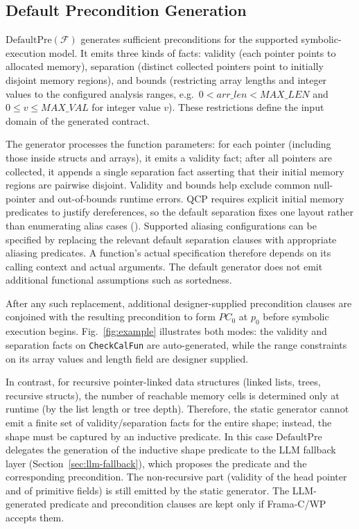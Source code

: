 \subsection{Default Precondition Generation}
\label{sec:default-pre}
{$\mathrm{DefaultPre}(\mathcal{F})$ generates sufficient preconditions for the supported symbolic-execution model. It emits three kinds of facts: validity (each pointer points to allocated memory), separation (distinct collected pointers point to initially disjoint memory regions), and bounds (restricting array lengths and integer values to the configured analysis ranges, e.g.\ $0 < \mathit{arr\_len} < \mathit{MAX\_LEN}$ and $0 \le v \le \mathit{MAX\_VAL}$ for integer value $v$). These restrictions define the input domain of the generated contract.

The generator processes the function parameters: for each pointer (including those inside structs and arrays), it emits a validity fact; after all pointers are collected, it appends a single separation fact asserting that their initial memory regions are pairwise disjoint. Validity and bounds help exclude common null-pointer and out-of-bounds runtime errors. {QCP requires explicit initial memory predicates to justify dereferences, so the default separation fixes one layout rather than enumerating alias cases (). Supported aliasing configurations can be specified by replacing the relevant default separation clauses with appropriate aliasing predicates. A function's actual specification therefore depends on its calling context and actual arguments.} The default generator does not emit additional functional assumptions such as sortedness.}



{After any such replacement, additional designer-supplied precondition clauses are conjoined with the resulting precondition to form $PC_0$ at $p_0$ before symbolic execution begins.} Fig.~\ref{fig:example} illustrates both modes: the validity and separation facts on \texttt{CheckCalFun} are auto-generated, while the range constraints on its array values and length field are designer supplied.

In contrast, for recursive pointer-linked data structures (linked lists, trees, recursive structs), the number of reachable memory cells is determined only at runtime (by the list length or tree depth). Therefore, the static generator cannot emit a finite set of validity/separation facts for the entire shape; instead, the shape must be captured by an inductive predicate. In this case $\mathrm{DefaultPre}$ delegates the generation of the inductive shape predicate to the LLM fallback layer (Section~\ref{sec:llm-fallback}), which proposes the predicate and the corresponding precondition. The non-recursive part (validity of the head pointer and of primitive fields) is still emitted by the static generator. The LLM-generated predicate and precondition clauses are kept only if Frama-C/WP accepts them.

 
